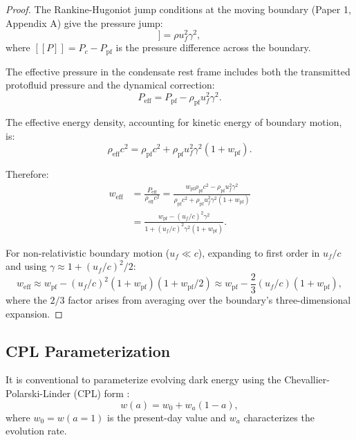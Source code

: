\documentclass[11pt,a4paper]{article}
\newcommand{\wpf}{\ensuremath{w_{\mathrm{pf}}}}
\newcommand{\weff}{\ensuremath{w_{\mathrm{eff}}}}
\newcommand{\Ppf}{\ensuremath{P_{\mathrm{pf}}}}
\newcommand{\rhopf}{\ensuremath{\rho_{\mathrm{pf}}}}
\theoremstyle{definition}
\theoremstyle{remark}
\begin{document}
\begin{proof}
The Rankine-Hugoniot jump conditions at the moving boundary (Paper 1, Appendix A) give the pressure jump:
\begin{equation}
[\![P]\!] = \rho u_f^2 \gamma^2,
\end{equation}
where $[\![P]\!] = P_c - \Ppf$ is the pressure difference across the boundary.

The effective pressure in the condensate rest frame includes both the transmitted protofluid pressure and the dynamical correction:
\begin{equation}
P_{\mathrm{eff}} = \Ppf - \rhopf u_f^2 \gamma^2.
\end{equation}

The effective energy density, accounting for kinetic energy of boundary motion, is:
\begin{equation}
\rho_{\mathrm{eff}} c^2 = \rhopf c^2 + \rhopf u_f^2 \gamma^2 (1 + \wpf).
\end{equation}

Therefore:
\begin{align}
\weff &= \frac{P_{\mathrm{eff}}}{\rho_{\mathrm{eff}} c^2} = \frac{\wpf \rhopf c^2 - \rhopf u_f^2 \gamma^2}{\rhopf c^2 + \rhopf u_f^2 \gamma^2(1 + \wpf)} \\
&= \frac{\wpf - (u_f/c)^2 \gamma^2}{1 + (u_f/c)^2 \gamma^2(1 + \wpf)}.
\end{align}

For non-relativistic boundary motion ($u_f \ll c$), expanding to first order in $u_f/c$ and using $\gamma \approx 1 + (u_f/c)^2/2$:
\begin{equation}
\weff \approx \wpf - (u_f/c)^2(1 + \wpf)(1 + \wpf/2) \approx \wpf - \frac{2}{3}(u_f/c)(1 + \wpf),
\end{equation}
where the $2/3$ factor arises from averaging over the boundary's three-dimensional expansion. \qedhere
\end{proof}

\subsection{CPL Parameterization}
\label{sec:cpl}

It is conventional to parameterize evolving dark energy using the Chevallier-Polarski-Linder (CPL) form \cite{Chevallier2001,Linder2003}:
\begin{equation}
\label{eq:CPL}
w(a) = w_0 + w_a(1 - a),
\end{equation}
where $w_0 = w(a=1)$ is the present-day value and $w_a$ characterizes the evolution rate.
\end{document}
